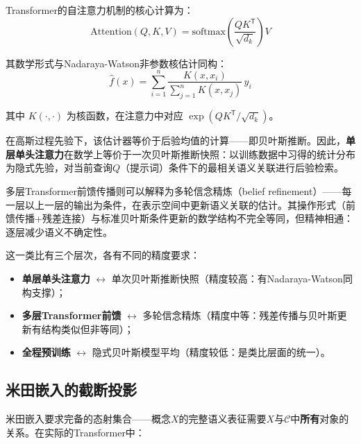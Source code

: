 \documentclass[11pt,a4paper]{ctexart}
\begin{document}
Transformer的自注意力机制的核心计算为：
\begin{equation}
    \mathrm{Attention}(Q,K,V) = \mathrm{softmax}\!\left(\frac{QK^{\mathsf{T}}}{\sqrt{d_k}}\right)V
\end{equation}

其数学形式与Nadaraya-Watson非参数核估计同构：
\begin{equation}
    \hat{f}(x) = \sum_{i=1}^{n} \frac{K(x, x_i)}{\sum_{j=1}^{n} K(x, x_j)}\, y_i
\end{equation}

其中 $K(\cdot,\cdot)$ 为核函数，在注意力中对应 $\exp(QK^{\mathsf{T}}/\sqrt{d_k})$。

在高斯过程先验下，该估计器等价于后验均值的计算——即贝叶斯推断。因此，\textbf{单层单头注意力}在数学上等价于一次贝叶斯推断快照：以训练数据中习得的统计分布为隐式先验，对当前查询$Q$（提示词）条件下的最相关语义关联进行后验检索。

多层Transformer前馈传播则可以解释为多轮信念精炼（belief refinement）——每一层以上一层的输出为条件，在表示空间中更新语义关联的估计。其操作形式（前馈传播+残差连接）与标准贝叶斯条件更新的数学结构不完全等同，但精神相通：逐层减少语义不确定性。

这一类比有三个层次，各有不同的精度要求：
\begin{itemize}[leftmargin=*]
    \item \textbf{单层单头注意力} $\leftrightarrow$ 单次贝叶斯推断快照（精度较高：有Nadaraya-Watson同构支撑）；
    \item \textbf{多层Transformer前馈} $\leftrightarrow$ 多轮信念精炼（精度中等：残差传播与贝叶斯更新有结构类似但非等同）；
    \item \textbf{全程预训练} $\leftrightarrow$ 隐式贝叶斯模型平均（精度较低：是类比层面的统一）。
\end{itemize}

\subsection{米田嵌入的截断投影}

米田嵌入要求完备的态射集合——概念$X$的完整语义表征需要$X$与$\mathcal{C}$中\textbf{所有}对象的关系。在实际的Transformer中：
\end{document}
